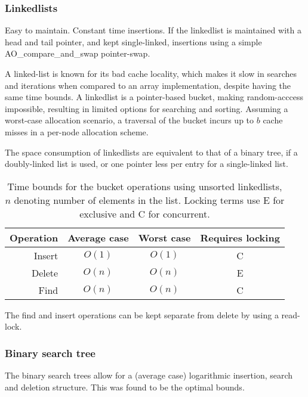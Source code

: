 \subsubsection{Linkedlists}
Easy to maintain. Constant time insertions.
If the linkedlist is maintained with a {\keyword head} and {\keyword tail} pointer,
and kept single-linked, insertions using a simple {\keyword AO\_compare\_and\_swap}
pointer-swap.

A linked-list is known for its bad cache locality, which makes it slow in
searches and iterations when compared to an array implementation, despite
having the same time bounds. A linkedlist is a pointer-based bucket, making
random-acccess impossible, resulting in limited options for searching and
sorting. Assuming a worst-case allocation scenario, a traversal of the bucket
incurs up to $b$ cache misses in a per-node allocation scheme.

The space consumption of linkedlists are equivalent to that of a binary tree,
if a doubly-linked list is used, or one pointer less per entry for a
single-linked list.

\begin{table}[h!]
    \centering
    \begin{tabular}[here]{ r || c | c | c}
        Operation & Average case & Worst case & Requires locking  \\ \hline
        Insert    & $O(1)$ & $O(1)$   & C  \\ \hline
        Delete    & $O(n)$ & $O(n)$   & E \\ \hline
        Find      & $O(n)$ & $O(n)$   & C  \\ \hline
    \end{tabular}
    \caption{Time bounds for the bucket operations using unsorted linkedlists,
    $n$ denoting number of elements in the list. Locking terms use E for
        exclusive and C for concurrent.}
    \label{tab:bounds:linkedlist}
\end{table}
The find and insert operations can be kept separate from delete by using a
read-lock.

\subsubsection{Binary search tree}
The binary search trees allow for a (average case) logarithmic insertion,
search and deletion structure. This was found to be the optimal
bounds\cite{Nash2008}.

